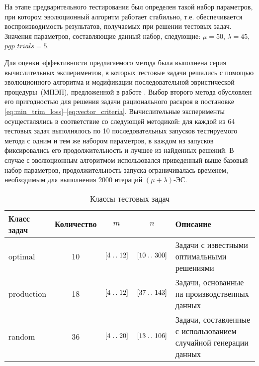 \documentclass[12pt]{article}
\newcommand\tablecaption[1]{
    \captionsetup{labelsep=newline,justification=centering}
    \caption{#1}
}
\begin{document}
На этапе предварительного тестирования был определен такой набор параметров, 
при котором эволюционный алгоритм работает стабильно, т.е. обеспечивается 
воспроизводимость результатов, получаемых при решении тестовых задач. 
Значения параметров, составляющие данный набор, следующие: $\mu = 50$, 
$\lambda = 45$, $pgp\_trials = 5$.

Для оценки эффективности предлагаемого метода была выполнена серия 
вычислительных экспериментов, в которых тестовые задачи решались с помощью 
эволюционного алгоритма и модификации последовательной эвристической 
процедуры~(МПЭП), предложенной в работе 
\cite{vahrenkamp96}. 
Выбор второго метода обусловлен 
его пригодностью для решения задачи рационального раскроя в постановке 
\eqref{eq:min_trim_loss}--\eqref{eq:vector_criteria}. 
Вычислительные эксперименты осуществлялись в соответствие со 
следующей методикой: для каждой из 64 тестовых задач выполнялось по 10 
последовательных запусков тестируемого метода с одним и тем же набором 
параметров, в каждом из запусков фиксировались его продолжительность и лучшее 
из найденных решений. В случае с эволюционным алгоритмом использовался 
приведенный выше базовый набор параметров, продолжительность запуска 
ограничивалась временем, необходимым для выполнения 2000 итераций 
$(\mu + \lambda)$-ЭС. 
\begin{table}[ht]
    \centering
    \tablecaption{Классы тестовых задач}
    \label{tab:test_data}    
    \begin{tabular}{|l|c|c|c|P{0.3\textwidth}|}
        \hline Класс задач & Количество & $m$ & $n$ 
            & Описание \\ \hline
        optimal & 10 & $[4 \mathrel{\ldotp\ldotp} 12]$ & $[10 \mathrel{\ldotp\ldotp} 300]$       
            & Задачи с известными оптимальными решениями \\ \hline
        production & 18 & $[4 \mathrel{\ldotp\ldotp} 12]$ & $[37 \mathrel{\ldotp\ldotp} 143]$
            & Задачи, основанные на производственных данных \\ \hline
        random & 36 & $[4 \mathrel{\ldotp\ldotp} 20]$ & $[13 \mathrel{\ldotp\ldotp} 106]$
            & Задачи, составленные с использованием случайной генерации данных \\ \hline
    \end{tabular}    
\end{table}
\end{document}
